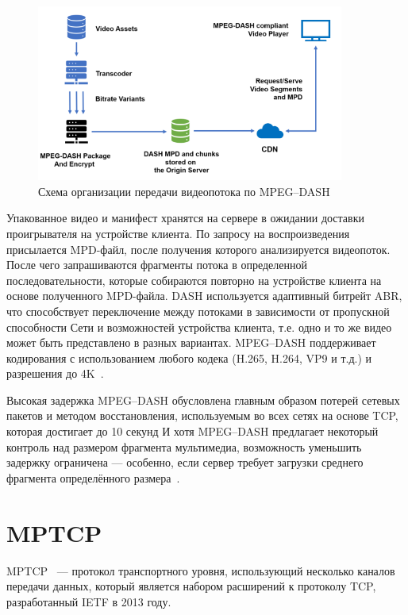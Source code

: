 \begin{figure}[h]
	\centering
	\includegraphics[width=0.9\textwidth]{img/mpeg-dash.png}
	\caption{Схема организации передачи видеопотока по MPEG--DASH~\cite{mpeg-dash-2012}}
	\label{pr:mpeg-dash}
\end{figure}

Упакованное видео и манифест хранятся на сервере в ожидании доставки проигрывателя  на устройстве клиента.
По запросу на воспроизведения присылается MPD-файл, после получения которого анализируется видеопоток.
После чего запрашиваются фрагменты потока в определенной последовательности, которые собираются повторно на устройстве клиента на основе полученного MPD-файла.
DASH используется адаптивный битрейт ABR, что способствует переключение между потоками в зависимости от пропускной способности Сети и возможностей устройства клиента, т.е. одно и то же видео может быть представлено в разных вариантах. 
MPEG--DASH поддерживает кодирования с использованием любого кодека (H.265, H.264, VP9 и т.д.) и разрешения до 4K~\cite{mpeg-dash-2012, mpeg-dash-2019}.

Высокая задержка MPEG--DASH обусловлена главным образом потерей сетевых пакетов и методом восстановления, используемым во всех сетях на основе TCP, которая достигает до 10 секунд
И хотя MPEG--DASH предлагает некоторый контроль над размером фрагмента мультимедиа, возможность уменьшить задержку ограничена --- особенно, если сервер требует загрузки среднего фрагмента определённого размера~\cite{mpeg-dash-2012, mpeg-dash-2019}.

\section{MPTCP}

MPTCP~\cite{rfc-mptcp-6824} --- протокол транспортного уровня, использующий несколько каналов передачи данных, который является набором расширений к протоколу TCP, разработанный IETF в 2013 году.

